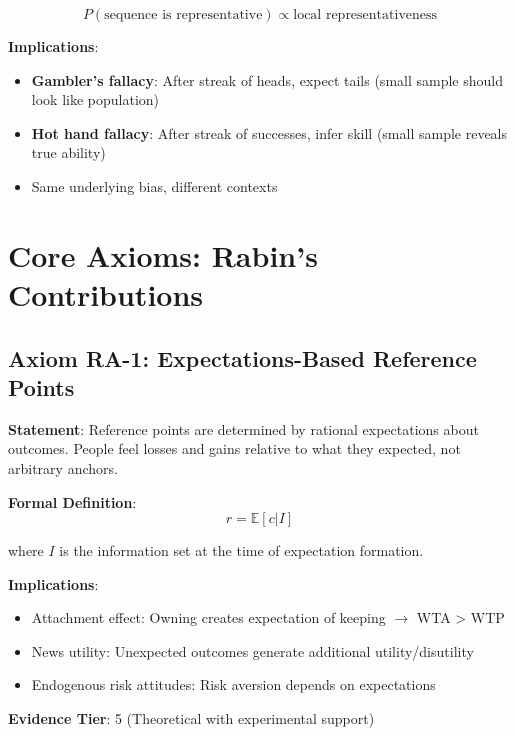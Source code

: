 \begin{equation}
P(\text{sequence is representative}) \propto \text{local representativeness}
\end{equation}

\textbf{Implications}:
\begin{itemize}
    \item \textbf{Gambler's fallacy}: After streak of heads, expect tails (small sample should look like population)
    \item \textbf{Hot hand fallacy}: After streak of successes, infer skill (small sample reveals true ability)
    \item Same underlying bias, different contexts
\end{itemize}

\section{Core Axioms: Rabin's Contributions}

\subsection{Axiom RA-1: Expectations-Based Reference Points}

\begin{tcolorbox}[colback=blue!5!white,colframe=blue!75!black,title=Axiom RA-1: Expectations-Based Reference Points]
\textbf{Statement}: Reference points are determined by rational expectations about outcomes. People feel losses and gains relative to what they expected, not arbitrary anchors.

\textbf{Formal Definition}:
\begin{equation}
r = \mathbb{E}[c | I]
\end{equation}

where $I$ is the information set at the time of expectation formation.

\textbf{Implications}:
\begin{itemize}
    \item Attachment effect: Owning creates expectation of keeping $\rightarrow$ WTA > WTP
    \item News utility: Unexpected outcomes generate additional utility/disutility
    \item Endogenous risk attitudes: Risk aversion depends on expectations
\end{itemize}

\textbf{Evidence Tier}: 5 (Theoretical with experimental support)
\end{tcolorbox}

